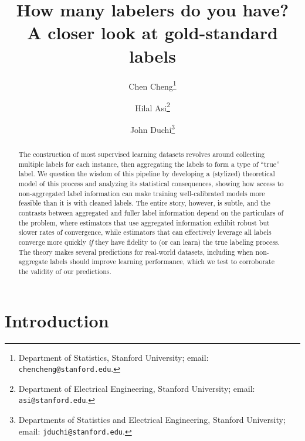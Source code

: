 \documentclass[11pt]{article}
\title{How many labelers do you have? \\
  A closer look at gold-standard labels}
\author{%
  Chen Cheng\thanks{Department of Statistics, Stanford University; email: \texttt{chencheng@stanford.edu}.} \and
  Hilal Asi\thanks{Department of Electrical Engineering, Stanford University; email: \texttt{asi@stanford.edu}.}
  \and
  John Duchi\thanks{Departments of Statistics and Electrical Engineering, Stanford University; email: \texttt{jduchi@stanford.edu}.}
}
\newcommand{\<}{\langle} %
\renewcommand{\>}{\rangle}
\begin{document}
\maketitle


\begin{abstract}
  The construction of most supervised learning datasets revolves around
  collecting multiple labels for each instance, then aggregating the labels
  to form a type of ``true'' label.
  We question the wisdom of this pipeline by developing a (stylized)
  theoretical model of this process and analyzing its statistical
  consequences, showing how access to non-aggregated label information can
  make training well-calibrated models more feasible than it is with
  cleaned labels.
  The entire story, however, is subtle, and the
  contrasts between aggregated and fuller label information depend on
  the particulars of the problem,
  where estimators that use aggregated information exhibit robust but slower
  rates of convergence, while estimators that can effectively
  leverage all labels converge more quickly \emph{if} they have
  fidelity to (or can learn) the true labeling process.
  The theory
  makes several predictions for real-world datasets, including when
  non-aggregate labels should improve learning performance, which we
  test to corroborate the validity of our predictions.
\end{abstract}




\section{Introduction}
\end{document}
